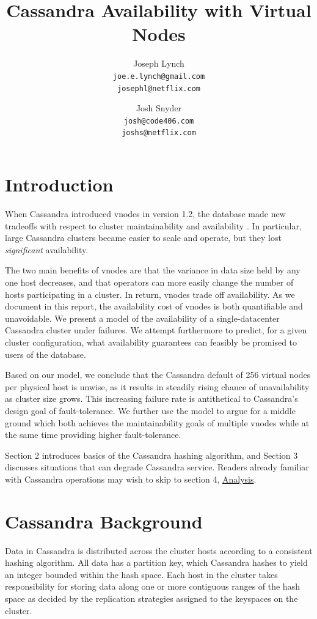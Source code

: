 \documentclass{article}
\title{Cassandra Availability with Virtual Nodes}
\author{
  Joseph Lynch\\
  \texttt{joe.e.lynch@gmail.com}\\
  \texttt{josephl@netflix.com}
  \and
  Josh Snyder\\
  \texttt{josh@code406.com}\\
  \texttt{joshs@netflix.com}
}
\begin{document}
\maketitle

\section{Introduction}
When Cassandra introduced vnodes in version 1.2, the database made new tradeoffs
with respect to cluster maintainability and availability \cite{vnodes}. In particular,
large Cassandra clusters became easier to scale and operate, but they lost
\textit{significant} availability.

The two main benefits of vnodes are that the variance in data size held by any
one host decreases, and that operators can more easily change the number of
hosts participating in a cluster. In return, vnodes trade off availability. As
we document in this report, the availability cost of vnodes is both
quantifiable and unavoidable. We present a model of the availability of a
single-datacenter Cassandra cluster under failures. We attempt furthermore
to predict, for a given cluster configuration, what availability guarantees
can feasibly be promised to users of the database.

Based on our model, we conclude that the Cassandra default of 256 virtual nodes
per physical host is unwise, as it results in steadily rising chance of
unavailability as cluster size grows. This increasing failure rate is
antithetical to Cassandra's design goal of fault-tolerance. We further use
the model to argue for a middle ground which both achieves the maintainability
goals of multiple vnodes while at the same time providing higher fault-tolerance.

Section 2 introduces basics of the Cassandra hashing algorithm, and Section 3
discusses situations that can degrade Cassandra service. Readers already familiar
with Cassandra operations may wish to skip to section 4, \hyperref[sec:analysis]{Analysis}.

\section{Cassandra Background}
Data in Cassandra is distributed across the cluster hosts according to a
consistent hashing algorithm. All data has a partition key, which Cassandra
hashes to yield an integer bounded within the hash space. Each host in the
cluster takes responsibility for storing data along one or more contiguous
ranges of the hash space as decided by the replication strategies assigned
to the keyspaces on the cluster.
\end{document}
